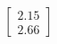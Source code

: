 \documentclass[preview]{standalone}
\begin{document}
\begin{align*}
\begin{bmatrix} 2.15 \\ 2.66 \end{bmatrix}
\end{align*}
\end{document}
